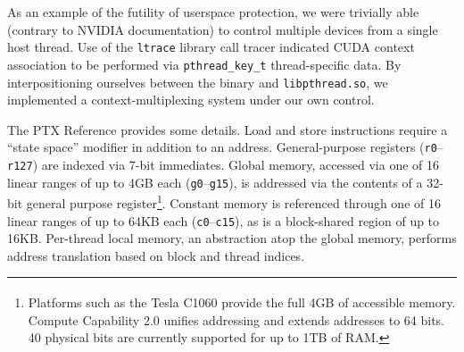 \documentclass[letterpaper,10pt]{article}
\begin{document}
\begin{multicols}{2}
As an example of the futility of userspace protection, we were trivially able
(contrary to NVIDIA documentation) to control multiple devices from a single
host thread. Use of the \texttt{ltrace} library call tracer indicated CUDA
context association to be performed via \texttt{pthread\_key\_t} thread-specific
data. By interpositioning ourselves between the binary and \texttt{libpthread.so},
we implemented a context-multiplexing system under our own control.

The PTX Reference provides some details. Load and store instructions require a ``state space''
modifier in addition to an address. General-purpose registers (\texttt{r0}--\texttt{r127}) are
indexed via 7-bit immediates. Global memory, accessed via one of 16 linear ranges
of up to 4GB each (\texttt{g0}--\texttt{g15}), is addressed via the
contents of a 32-bit general purpose register\footnote{Platforms such as the Tesla\textsuperscript{\texttrademark} C1060 provide the
full 4GB of accessible memory. Compute Capability 2.0 unifies addressing
and extends addresses to 64 bits. 40 physical bits are currently
supported for up to 1TB of RAM.}. Constant memory is referenced through one of 16 linear ranges of up to
64KB each (\texttt{c0}--\texttt{c15}), as is a block-shared region of up to 16KB.
Per-thread local memory, an abstraction atop the global memory, performs
address translation based on block and thread indices.

\end{multicols}
\end{document}
